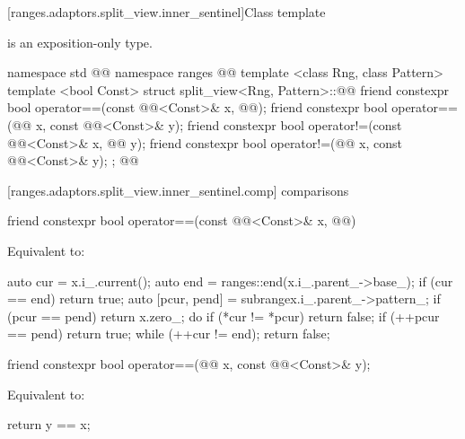 [ranges.adaptors.split_view.inner_sentinel]{Class template }

\pnum
\enternote {} is an exposition-only type.\exitnote

\begin{codeblock}
namespace std { @@ namespace ranges { @@
  template <class Rng, class Pattern>
  template <bool Const>
  struct split_view<Rng, Pattern>::@@ {
    friend constexpr bool operator==(const @@<Const>& x, @@);
    friend constexpr bool operator==(@@ x, const @@<Const>& y);
    friend constexpr bool operator!=(const @@<Const>& x, @@ y);
    friend constexpr bool operator!=(@@ x, const @@<Const>& y);
  };
}}@\removed{\}\}}@
\end{codeblock}

[ranges.adaptors.split_view.inner_sentinel.comp]{ comparisons}

%
\begin{itemdecl}
friend constexpr bool operator==(const @@<Const>& x, @@)
\end{itemdecl}

\begin{itemdescr}
\pnum
\effects Equivalent to:
\begin{codeblock}
auto cur = x.i_.current();
auto end = ranges::end(x.i_.parent_->base_);
if (cur == end) return true;
auto [pcur, pend] = subrange{x.i_.parent_->pattern_};
if (pcur == pend) return x.zero_;
do {
  if (*cur != *pcur) return false;
  if (++pcur == pend) return true;
} while (++cur != end);
return false;
\end{codeblock}
\end{itemdescr}

%
\begin{itemdecl}
friend constexpr bool operator==(@@ x, const @@<Const>& y);
\end{itemdecl}

\begin{itemdescr}
\pnum
\effects Equivalent to:
\begin{codeblock}
return y == x;
\end{codeblock}
\end{itemdescr}

